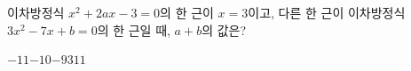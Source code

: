 이차방정식 $x^2+2ax-3=0$의 한 근이 $x=3$이고, 다른 한 근이 이차방정식 $3x^2-7x+b=0$의 한 근일 때, $a+b$의 값은? 
\begin{choices32}{$-11$}{$-10$}{$-9$}{$3$}{$11$}\end{choices32}
